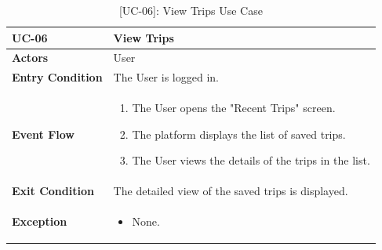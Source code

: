 \newpage
\begin{table}[H]
    \centering
    \setlength\extrarowheight{2pt}
    \renewcommand{\arraystretch}{1.2}
    \begin{tabularx}{\textwidth}{|>{\bfseries}l|X|}
    \hline
    UC-06 & View Trips \\ \hline
    Actors & User\\ \hline
    Entry Condition & The User is logged in.\\ \hline
    Event Flow & 
    \begin{enumerate}
      \item The User opens the "Recent Trips" screen.
      \item The platform displays the list of saved trips.
      \item The User views the details of the trips in the list.
    \end{enumerate}
    \\ \hline
    Exit Condition &  The detailed view of the saved trips is displayed.\\ \hline
    Exception & 
    \begin{itemize}
        \item None.
    \end{itemize}
    \\ \hline
   \end{tabularx}
   \caption{[UC-06]: View Trips Use Case}
    \label{UC-06}
\end{table}

